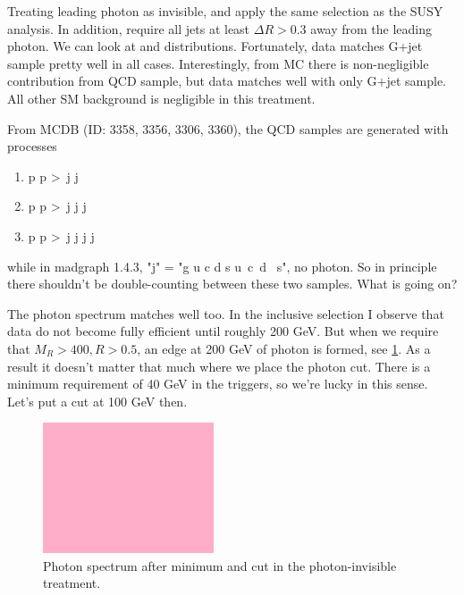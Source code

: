 

Treating leading photon as invisible, and apply the same selection as the SUSY analysis.
In addition, require all jets at least $\Delta R > 0.3$ away from the leading photon.
We can look at \MR and \R distributions.  Fortunately, data matches G+jet sample pretty
well in all cases.  Interestingly, from MC there is non-negligible contribution from QCD
sample, but data matches well with only G+jet sample.  All other SM background is
negligible in this treatment.

From MCDB (ID: 3358, 3356, 3306, 3360), the QCD samples are generated with processes
\begin{enumerate}
\item p p \textgreater ~j j
\item p p \textgreater ~j j j
\item p p \textgreater ~j j j j
\end{enumerate}
while in madgraph 1.4.3, "j" = "g u c d s u\tweakedtilde~c\tweakedtilde~d\tweakedtilde
~s\tweakedtilde", no photon.  So in principle there shouldn't
be double-counting between these two samples.  What is going on?  \ActionItem

The photon \PT spectrum matches well too.  In the inclusive selection I observe that data
do not become fully efficient until roughly 200 GeV.  But when we require that $M_R > 400,
R > 0.5$, an edge at 200 GeV of photon \PT is formed, see \ref{Figure_7731_PhotonPT}.
As a result it doesn't matter that much where we place the photon \PT cut.
There is a minimum \PT requirement of 40 GeV in the triggers, so we're lucky in this sense.
Let's put a cut at 100 GeV then.

\begin{figure}
\centering
\includegraphics[width=0.45\textwidth]{ToBeDrawn.png}
\caption{Photon \PT spectrum after minimum \MR and \R cut in the photon-invisible treatment.}
\label{Figure_7731_PhotonPT}
\end{figure}

